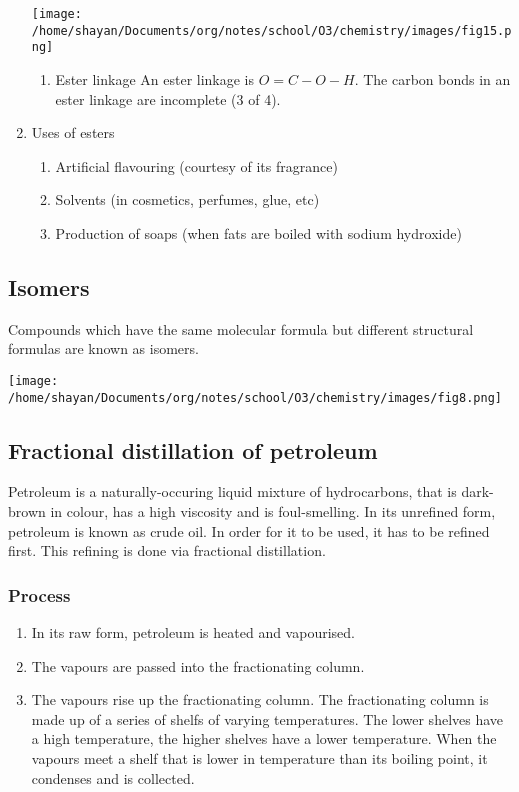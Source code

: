 \documentclass[11pt]{article}
\begin{document}
\begin{enumerate}
\begin{center}
\texttt{[image: /home/shayan/Documents/org/notes/school/O3/chemistry/images/fig15.png]}
\end{center}
\begin{enumerate}
\item Ester linkage
\label{sec:org160a64e}
An ester linkage is \(O=C-O-H\). The carbon bonds in an ester linkage are incomplete (3 of 4).
\end{enumerate}
\item Uses of esters
\label{sec:org491de88}
\begin{enumerate}
\item Artificial flavouring (courtesy of its fragrance)
\item Solvents (in cosmetics, perfumes, glue, etc)
\item Production of soaps (when fats are boiled with sodium hydroxide)
\end{enumerate}
\end{enumerate}
\subsection{Isomers}
\label{sec:orga0d604f}
Compounds which have the same molecular formula but different structural formulas are known as isomers.
\begin{center}
\texttt{[image: /home/shayan/Documents/org/notes/school/O3/chemistry/images/fig8.png]}
\end{center}
\subsection{Fractional distillation of petroleum}
\label{sec:org64d8ec4}
Petroleum is a naturally-occuring liquid mixture of hydrocarbons, that is dark-brown in colour, has a high viscosity and is foul-smelling. In its unrefined form, petroleum is known as crude oil. In order for it to be used, it has to be refined first. This refining is done via fractional distillation.
\subsubsection{Process}
\label{sec:org5f9f30f}
\begin{enumerate}
\item In its raw form, petroleum is heated and vapourised.
\item The vapours are passed into the fractionating column.
\item The vapours rise up the fractionating column. The fractionating column is made up of a series of shelfs of varying temperatures. The lower shelves have a high temperature, the higher shelves have a lower temperature. When the vapours meet a shelf that is lower in temperature than its boiling point, it condenses and is collected.
\end{enumerate}
\end{document}
